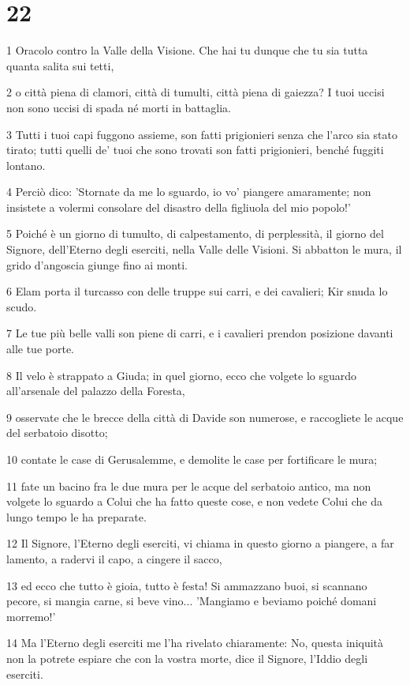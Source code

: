 \chapter{22}

\par 1 Oracolo contro la Valle della Visione. Che hai tu dunque che tu sia tutta quanta salita sui tetti,
\par 2 o città piena di clamori, città di tumulti, città piena di gaiezza? I tuoi uccisi non sono uccisi di spada né morti in battaglia.
\par 3 Tutti i tuoi capi fuggono assieme, son fatti prigionieri senza che l'arco sia stato tirato; tutti quelli de' tuoi che sono trovati son fatti prigionieri, benché fuggiti lontano.
\par 4 Perciò dico: 'Stornate da me lo sguardo, io vo' piangere amaramente; non insistete a volermi consolare del disastro della figliuola del mio popolo!'
\par 5 Poiché è un giorno di tumulto, di calpestamento, di perplessità, il giorno del Signore, dell'Eterno degli eserciti, nella Valle delle Visioni. Si abbatton le mura, il grido d'angoscia giunge fino ai monti.
\par 6 Elam porta il turcasso con delle truppe sui carri, e dei cavalieri; Kir snuda lo scudo.
\par 7 Le tue più belle valli son piene di carri, e i cavalieri prendon posizione davanti alle tue porte.
\par 8 Il velo è strappato a Giuda; in quel giorno, ecco che volgete lo sguardo all'arsenale del palazzo della Foresta,
\par 9 osservate che le brecce della città di Davide son numerose, e raccogliete le acque del serbatoio disotto;
\par 10 contate le case di Gerusalemme, e demolite le case per fortificare le mura;
\par 11 fate un bacino fra le due mura per le acque del serbatoio antico, ma non volgete lo sguardo a Colui che ha fatto queste cose, e non vedete Colui che da lungo tempo le ha preparate.
\par 12 Il Signore, l'Eterno degli eserciti, vi chiama in questo giorno a piangere, a far lamento, a radervi il capo, a cingere il sacco,
\par 13 ed ecco che tutto è gioia, tutto è festa! Si ammazzano buoi, si scannano pecore, si mangia carne, si beve vino... 'Mangiamo e beviamo poiché domani morremo!'
\par 14 Ma l'Eterno degli eserciti me l'ha rivelato chiaramente: No, questa iniquità non la potrete espiare che con la vostra morte, dice il Signore, l'Iddio degli eserciti.
